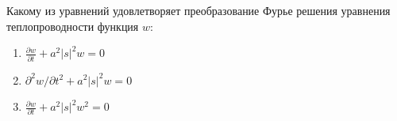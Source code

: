 Какому из уравнений удовлетворяет преобразование Фурье решения уравнения теплопроводности функция \(w\):

\begin{enumerate}[label=\arabic*)]
    \item \(\frac{\partial w}{\partial t}+a^2\vert s\vert ^2w=0\)
    \item \(\partial ^2w/\partial t^2+a^2\vert s\vert ^2w=0\)
    \item \(\frac{\partial w}{\partial t}+a^2\vert s\vert ^2w^2=0\)
\end{enumerate}

